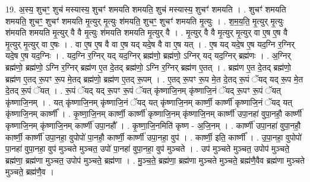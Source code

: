 \documentclass[17pt]{extarticle}
\begin{document}
19. अ॒स्य॒ शुचꣳ॒॒ शुच॑ मस्यास्य॒ शुचꣳ॑ शमयति शमयति॒ शुच॑ मस्यास्य॒ शुचꣳ॑ शमयति । . शुचꣳ॑ शमयति शमयति॒ शुचꣳ॒॒ शुचꣳ॑ शमयति मृ॒त्युर् मृ॒त्युः श॑मयति॒ शुचꣳ॒॒ शुचꣳ॑ शमयति मृ॒त्युः । . श॒म॒य॒ति॒ मृ॒त्युर् मृ॒त्युः श॑मयति शमयति मृ॒त्युर् वै वै मृ॒त्युः श॑मयति शमयति मृ॒त्युर् वै । . मृ॒त्युर् वै वै मृ॒त्युर् मृ॒त्युर् वा ए॒ष ए॒ष वै मृ॒त्युर् मृ॒त्युर् वा ए॒षः । . वा ए॒ष ए॒ष वै वा ए॒ष यद् यदे॒ष वै वा ए॒ष यत् । . ए॒ष यद् यदे॒ष ए॒ष यद॒ग्नि र॒ग्निर् यदे॒ष ए॒ष यद॒ग्निः । . यद॒ग्नि र॒ग्निर् यद् यद॒ग्निर् ब्रह्म॑णो॒ ब्रह्म॑णो॒ ऽग्निर् यद् यद॒ग्निर् ब्रह्म॑णः । . अ॒ग्निर् ब्रह्म॑णो॒ ब्रह्म॑णो॒ ऽग्नि र॒ग्निर् ब्रह्म॑ण ए॒त दे॒तद् ब्रह्म॑णो॒ ऽग्नि र॒ग्निर् ब्रह्म॑ण ए॒तत् । . ब्रह्म॑ण ए॒त दे॒तद् ब्रह्म॑णो॒ ब्रह्म॑ण ए॒तद् रू॒पꣳ रू॒प मे॒तद् ब्रह्म॑णो॒ ब्रह्म॑ण ए॒तद् रू॒पम् । . ए॒तद् रू॒पꣳ रू॒प मे॒त दे॒तद् रू॒पं ॅयद् यद् रू॒प मे॒त दे॒तद् रू॒पं ॅयत् । . रू॒पं ॅयद् यद् रू॒पꣳ रू॒पं ॅयत् कृ॑ष्णाजि॒नम् कृ॑ष्णाजि॒नं ॅयद् रू॒पꣳ रू॒पं ॅयत् कृ॑ष्णाजि॒नम् । . यत् कृ॑ष्णाजि॒नम् कृ॑ष्णाजि॒नं ॅयद् यत् कृ॑ष्णाजि॒नम् कार्ष्णी॒ कार्ष्णी॑ कृष्णाजि॒नं ॅयद् यत् कृ॑ष्णाजि॒नम् कार्ष्णी᳚ । . कृ॒ष्णा॒जि॒नम् कार्ष्णी॒ कार्ष्णी॑ कृष्णाजि॒नम् कृ॑ष्णाजि॒नम् कार्ष्णी॑ उपा॒नहा॑ वुपा॒नहौ॒ कार्ष्णी॑ कृष्णाजि॒नम् कृ॑ष्णाजि॒नम् कार्ष्णी॑ उपा॒नहौ᳚ । . कृ॒ष्णा॒जि॒नमिति॑ कृष्ण - अ॒जि॒नम् । . कार्ष्णी॑ उपा॒नहा॑ वुपा॒नहौ॒ कार्ष्णी॒ कार्ष्णी॑ उपा॒नहा॒ वुपोपो॑ पा॒नहौ॒ कार्ष्णी॒ कार्ष्णी॑ उपा॒नहा॒ वुप॑ । . कार्ष्णी॒ इति॒ कार्ष्णी᳚ । . उ॒पा॒नहा॒ वुपोपो॑ पा॒नहा॑ वुपा॒नहा॒ वुप॑ मुञ्चते मुञ्चत॒ उपो॑ पा॒नहा॑ वुपा॒नहा॒ वुप॑ मुञ्चते । . उप॑ मुञ्चते मुञ्चत॒ उपोप॑ मुञ्चते॒ ब्रह्म॑णा॒ ब्रह्म॑णा मुञ्चत॒ उपोप॑ मुञ्चते॒ ब्रह्म॑णा । . मु॒ञ्च॒ते॒ ब्रह्म॑णा॒ ब्रह्म॑णा मुञ्चते मुञ्चते॒ ब्रह्म॑णै॒वैव ब्रह्म॑णा मुञ्चते मुञ्चते॒ ब्रह्म॑णै॒व । \newline
\end{document}
